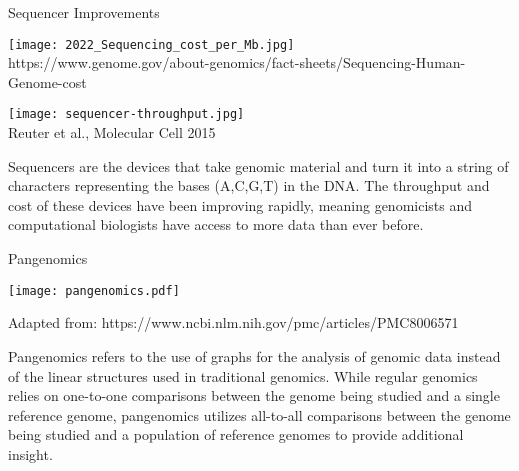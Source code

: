 \documentclass{cbxposter}
\renewcommand{\smallskip}{\vspace{0.16667in}}
\begin{document}
\begin{frame}[fragile,t]{}
\begin{columns}[T]
\begin{column}{10.5in}

\vspace{0.67in}
\begin{block}{Sequencer Improvements}
  \begin{center}
    \begin{minipage}[t]{0.45\tw}
      \vspace{0pt}\centering
      \smallskip
      \texttt{[image: 2022\_Sequencing\_cost\_per\_Mb.jpg]}\\
      \smallskip
      https://www.genome.gov/about-genomics/fact-sheets/Sequencing-Human-Genome-cost\\
    \end{minipage}
    \begin{minipage}[t]{0.45\tw}
      \vspace{0pt}\centering
      \smallskip
      \texttt{[image: sequencer-throughput.jpg]}\\
      \smallskip
      Reuter et al., Molecular Cell 2015\\
    \end{minipage}
  \end{center}
  \smallskip

  Sequencers are the devices that take genomic material and turn it
  into a string of characters representing the bases (A,C,G,T) in the DNA.
  The throughput and cost of these devices have been improving rapidly,
  meaning genomicists and computational biologists have access to more data
  than ever before.
  
\end{block}


\vspace{0.67in}
\begin{block}{Pangenomics}
  \begin{center}
    \texttt{[image: pangenomics.pdf]}
  \end{center}

  Adapted from: https://www.ncbi.nlm.nih.gov/pmc/articles/PMC8006571

  \smallskip

  Pangenomics refers to the use of graphs for the analysis of genomic data
  instead of the linear structures used in traditional genomics. While
  regular genomics relies on one-to-one comparisons between the genome being
  studied and a single reference genome, pangenomics utilizes all-to-all
  comparisons between the genome being studied and a population of reference
  genomes to provide additional insight.
  

\end{block}
\end{column}
\end{columns}
\end{frame}
\end{document}
